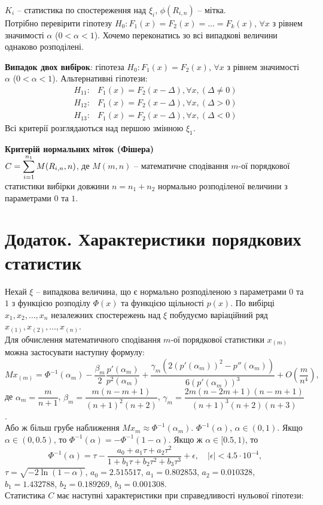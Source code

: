 $K_i$ -- статистика по спостереження над $\xi_i$, $\phi(R_{i,n})$ -- мітка. \\

Потрібно перевірити гіпотезу $H_0: F_1(x) = F_2(x) = \ldots = F_k(x)$, $\forall x$ з рівнем значимості $\alpha$ ($0 < \alpha < 1$). Хочемо переконатись зо всі випадкові величини однаково розподілені.

\textbf{Випадок двох вибірок}: гіпотеза $H_0: F_1(x) = F_2(x)$, $\forall x$ з рівнем значимості $\alpha$ ($0 < \alpha < 1$). Альтернативні гіпотези:
\begin{align*}
    H_{11}: & F_1(x) = F_2(x - \Delta), \forall x, (\Delta \ne 0) \\
    H_{12}: & F_1(x) = F_2(x - \Delta), \forall x, (\Delta > 0) \\
    H_{13}: & F_1(x) = F_2(x - \Delta), \forall x, (\Delta < 0)
\end{align*}
Всі критерії розглядаються над першою змінною $\xi_1$.

\textbf{Критерій нормальних міток (Фішера)} \\

$C = \displaystyle\sum\limits_{i=1}^{n_1} M(R_{i, n}, n)$, де $M(m, n)$ -- математичне сподівання $m$-ої порядкової статистики вибірки довжини $n = n_1 + n_2$ нормально розподіленої величини з параметрами $0$ та $1$. 

\section{Додаток. Характеристики порядкових статистик}

Нехай $\xi$ -- випадкова величина, що є нормально розподіленою з параметрами $0$ та $1$ з функцією розподілу $\Phi(x)$ та функцією щільності $p(x)$. По вибірці $x_1, x_2, \ldots, x_n$ незалежних спостережень над $\xi$ побудуємо варіаційний ряд $x_{(1)}, x_{(2)}, \ldots, x_{(n)}$. \\

Для обчислення математичного сподівання $m$-ої порядкової статистики $x_{(m)}$ можна застосувати наступну формулу:
\[ M x_{(m)} = \Phi^{-1}(\alpha_m) - \dfrac{\beta_m}{2} \dfrac{p'(\alpha_m)}{p^2(\alpha_m)} + \dfrac{\gamma_m (2 (p'(\alpha_m))^2 - p''(\alpha_m))}{6(p'(\alpha_m))^3} + O \left(\dfrac{m}{n^4}\right), \]
де $\alpha_m = \dfrac{m}{n + 1}$, $\beta_m = \dfrac{m(n-m+1)}{(n+1)^2(n+2)}$, $\gamma_m = \dfrac{2m(n-2m+1)(n-m+1)}{(n+1)^3(n+2)(n+3)}$. \\

Або ж більш грубе наближення $M x_m \approx \Phi^{-1}(\alpha_m)$. $\Phi^{-1}(\alpha)$, $\alpha\in (0, 1)$. Якщо $\alpha \in (0, 0.5)$, то $\Phi^{-1}(\alpha) = - \Phi^{-1}(1 - \alpha)$. Якщо ж $\alpha \in [0.5, 1)$, то \[ \Phi^{-1}(\alpha) = \tau - \dfrac{a_0 + a_1\tau + a_2\tau^2}{1 + b_1\tau + b_2\tau^2 + b_3\tau^3} + \epsilon, \quad |\epsilon| < 4.5 \cdot 10^{-4}, \] $\tau = \sqrt{-2\ln(1-\alpha)}$, $a_0 = 2.515517$, $a_1 = 0.802853$, $a_2 = 0.010328$, $b_1 = 1.432788$, $b_2 = 0.189269$, $b_3 = 0.001308$. \\

Статистика $C$ має наступні характеристики при справедливості нульової гіпотези:




